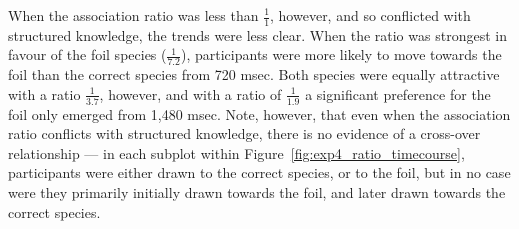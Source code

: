 When the association ratio was less than $\frac{1}{1}$, however,
and so conflicted with structured knowledge,
the trends were less clear.
When the ratio was strongest in favour of the foil species ($\frac{1}{7.2}$),
participants were more likely to move towards the foil
than the correct species from 720 msec.
Both species were equally attractive with a ratio $\frac{1}{3.7}$, however,
and with a ratio of $\frac{1}{1.9}$ a significant preference for the foil
only emerged from 1,480 msec.
Note, however, that even when the association ratio
conflicts with structured knowledge,
there is no evidence of a cross-over relationship ---
in each subplot within Figure~\ref{fig:exp4_ratio_timecourse},
participants were either drawn to the correct species, or to the foil,
but in no case were they primarily initially drawn towards the foil,
and later drawn towards the correct species.


